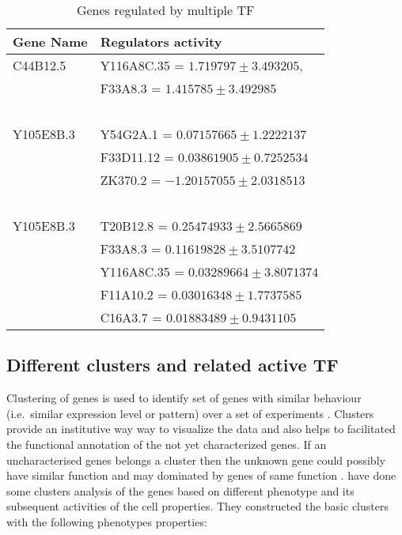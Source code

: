 \begin{table}
	\centering
\begin{tabular}{l l }
      \toprule
      \textbf{Gene Name} & \textbf{Regulators activity} \\
      \midrule
	      C44B12.5 & Y116A8C.35 = $ 1.719797 \pm 3.493205 $, \\ 
		       & F33A8.3 = $ 1.415785 \pm 3.492985$ \\~\\

	      Y105E8B.3 & Y54G2A.1 = $ 0.07157665 \pm 1.2222137 $ \\
			& F33D11.12 = $ 0.03861905 \pm 0.7252534 $ \\
			& ZK370.2 = $ -1.20157055 \pm  2.0318513 $\\~\\
		    
	      Y105E8B.3 & T20B12.8 = $ 0.25474933 \pm  2.5665869 $ \\
		  	& F33A8.3 = $ 0.11619828  \pm  3.5107742 $ \\
 		  	& Y116A8C.35 = $ 0.03289664 \pm  3.8071374 $ \\
			& F11A10.2 = $ 0.03016348 \pm 1.7737585 $ \\
 		  	& C16A3.7 = $ 0.01883489 \pm  0.9431105$\\

  \bottomrule
  \end{tabular}
	  \caption[Genes regulated by multiple TF]
		  {Genes regulated by multiple TF}
	  \label{table:Genes_regulated_by_multiple_TF}
\end{table}

\subsection{Different clusters and related active TF}
Clustering of genes is used to identify set of genes with similar behaviour (i.e.\ similar expression level or pattern) over a set of experiments \cite{Eisen:1998}. Clusters provide an institutive way way to visualize the data and also helps to facilitated the functional annotation of the not yet characterized genes. If an uncharacterised genes belongs a cluster then the unknown gene could possibly have similar function and may dominated by genes of same function \cite{Pe'er:2003}. \cite{Cossins:2007} have done some clusters analysis of the genes based on different phenotype and its subsequent activities of the cell properties. They constructed the basic clusters with the following phenotypes properties:

